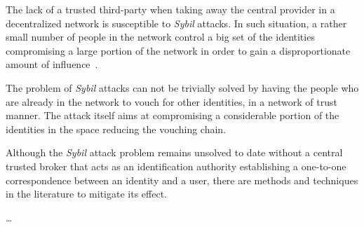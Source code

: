 The lack of a trusted third-party when taking away the central provider in a decentralized 
network is susceptible to \emph{Sybil} attacks. 
In such situation, a rather small number of people in the network control a big 
set of the identities compromising a large portion of the network in order to gain 
a disproportionate amount of influence~\cite{SybilAttack}.

The problem of \emph{Sybil} attacks can not be trivially solved by having the people 
who are already in the network to vouch for other identities, in a network of trust 
manner. The attack itself aims at compromising a considerable portion of the identities 
in the space reducing the vouching chain.

Although the \emph{Sybil} attack problem remains unsolved to date without a central trusted 
broker that acts as an identification authority establishing a one-to-one correspondence 
between an identity and a user, there are methods and techniques in the literature 
to mitigate its effect. 


\dots
